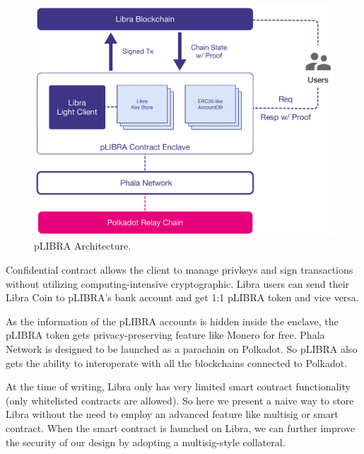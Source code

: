 \begin{figure}
    \centering \footnotesize
    \includegraphics[width=.7\columnwidth]{img/pLIBRA-contract}
    \caption{pLIBRA Architecture.}
    \label{fig:plibra}
\end{figure}

Confidential contract allows the client to manage privkeys and sign transactions without utilizing computing-intensive cryptographic. Libra users can send their Libra Coin to pLIBRA's bank account and get 1:1 pLIBRA token and vice versa.

As the information of the pLIBRA accounts is hidden inside the enclave, the pLIBRA token gets privacy-preserving feature like Monero for free. Phala Network is designed to be launched as a parachain on Polkadot. So pLIBRA also gets the ability to interoperate with all the blockchains connected to Polkadot.

At the time of writing, Libra only has very limited smart contract functionality (only whitelisted contracts are allowed). So here we present a naive way to store Libra without the need to employ an advanced feature like multisig or smart contract. When the smart contract is launched on Libra, we can further improve the security of our design by adopting a multisig-style collateral.

